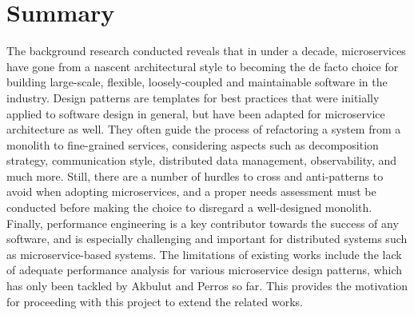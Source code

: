 \section{Summary}

The background research conducted reveals that in under a decade, microservices have gone from a nascent architectural
style to becoming the de facto choice for building large-scale, flexible, loosely-coupled and maintainable software in
the industry. Design patterns are templates for best practices that were initially applied to software design in general,
but have been adapted for microservice architecture as well. They often guide the process of refactoring a system from a
monolith to fine-grained services, considering aspects such as decomposition strategy, communication style,
distributed data management, observability, and much more. Still, there are a number of hurdles to cross and anti-patterns
to avoid when adopting microservices, and a proper needs assessment must be conducted before making the choice to disregard
a well-designed monolith. Finally, performance engineering is a key contributor towards the success of any software, and is
especially challenging and important for distributed systems such as microservice-based systems. The limitations of existing
works include the lack of adequate performance analysis for various microservice design patterns, which has only been tackled
by Akbulut and Perros \cite{akbulut19} so far. This provides the motivation for proceeding with this project to extend the
related works.
